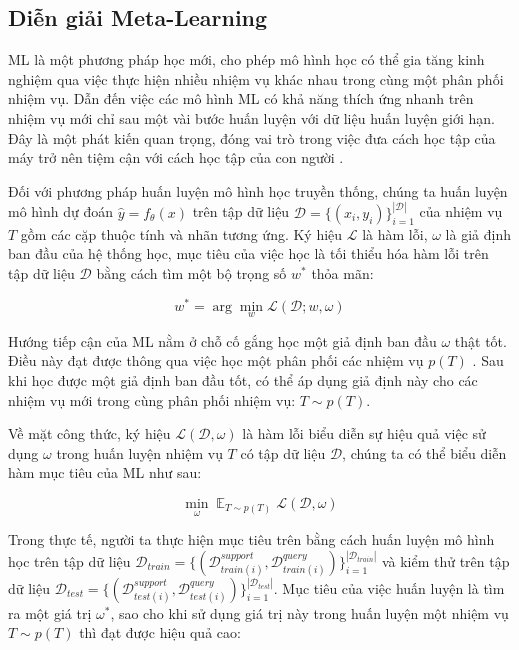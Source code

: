 \subsection{Diễn giải Meta-Learning}

ML là một phương pháp học mới, cho phép mô hình học có thể gia tăng kinh nghiệm qua việc thực hiện nhiều nhiệm vụ khác nhau trong cùng một phân phối nhiệm vụ. Dẫn đến việc các mô hình ML có khả năng thích ứng nhanh trên nhiệm vụ mới chỉ sau một vài bước huấn luyện với dữ liệu huấn luyện giới hạn. Đây là một phát kiến quan trọng, đóng vai trò trong việc đưa cách học tập của máy trở nên tiệm cận với cách học tập của con người \cite{harlow1949formation}.

Đối với phương pháp huấn luyện mô hình học truyền thống, chúng ta huấn luyện mô hình dự đoán $\hat{y} = f_\theta(x)$ trên tập dữ liệu $\mathcal{D} = \{ (x_i, y_i)\}_{i=1}^{|\mathcal{D}|}$ của nhiệm vụ $T$ gồm các cặp thuộc tính và nhãn tương ứng. Ký hiệu $\mathcal{L}$ là hàm lỗi, $\omega$ là giả định ban đầu của hệ thống học, mục tiêu của việc học là tối thiểu hóa hàm lỗi trên tập dữ liệu $\mathcal{D}$ bằng cách tìm một bộ trọng số $w^*$ thỏa mãn:

\begin{equation}
    w^* = \arg \min_w \mathcal{L}(\mathcal{D}; w, \omega)
\end{equation}

Hướng tiếp cận của ML nằm ở chỗ cố gắng học một giả định ban đầu $\omega$ thật tốt. Điều này đạt được thông qua việc học một phân phối các nhiệm vụ $p(T)$ \cite{hospedales2020meta}. Sau khi học được một giả định ban đầu tốt, có thể áp dụng giả định này cho các nhiệm vụ mới trong cùng phân phối nhiệm vụ: $T \sim p(T)$.

Về mặt công thức, ký hiệu $\mathcal{L}(\mathcal{D}, \omega)$ là hàm lỗi biểu diễn sự hiệu quả việc sử dụng $\omega$ trong huấn luyện nhiệm vụ $T$ có tập dữ liệu $\mathcal{D}$, chúng ta có thể biểu diễn hàm mục tiêu của ML như sau:

\begin{equation}
    \min_{\omega} \mathop{\mathbb{E}}_{T\sim p(T)} \mathcal{L}(\mathcal{D}, \omega)
\end{equation}

Trong thực tế, người ta thực hiện mục tiêu trên bằng cách huấn luyện mô hình học trên tập dữ liệu $\mathcal{D}_{train} = \{(\mathcal{D}_{train(i)}^{support}, \mathcal{D}_{train(i)}^{query})\}_{i=1}^{|\mathcal{D}_{train}|}$ và kiểm thử trên tập dữ liệu $\mathcal{D}_{test} = \{(\mathcal{D}_{test(i)}^{support}, \mathcal{D}_{test(i)}^{query})\}_{i=1}^{|\mathcal{D}_{test}|}$. Mục tiêu của việc huấn luyện là tìm ra một giá trị $\omega^*$, sao cho khi sử dụng giá trị này trong huấn luyện một nhiệm vụ $T\sim p(T)$ thì đạt được hiệu quả cao:

